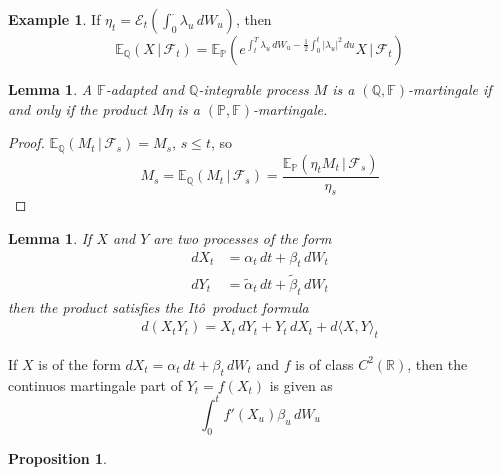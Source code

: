 \documentclass[10pt, oneside, reqno]{amsbook}
\theoremstyle{plain}%
\newtheorem{lem}[thm]{Lemma}
\newtheorem{prop}[thm]{Proposition}
\theoremstyle{definition}
\newtheorem{exmp}[thm]{Example}
\theoremstyle{rem}
\theoremstyle{definition}
\def \P {\ensuremath{\mathcal{P}}}
\newcommand{\given}{ \, | \,}
\newcommand{\sigf}{\mathcal{F}}
\newcommand{\Q}{\mathbb{Q}}
\newcommand{\R}{\mathbb{R}}
\newcommand{\E}{\mathbb{E}}
\renewcommand{\P}{\mathbb{P}}
\newcommand{\F}{\mathbb{F}}
\newcommand{\ito}{It\^o\ }
\newcommand{\doleans}[1]{\mathcal E_t \left(\int_0^\cdot #1 \right)}
\numberwithin{equation}{chapter}
\begin{document}
\begin{exmp}
    If $\eta_t = \doleans{\lambda_u \, dW_u}$, then \[
        \E_\Q(X \given \sigf_t) = \E_\P(e^{\int_t^T \lambda_u \, dW_u - \frac{1}{2} \int_0^t |\lambda_u|^2 \, du} X \given \sigf_t)
    \] 
\end{exmp}


\begin{lem}
    \label{lem:martingale_equivalence_measures}
    A $\F$-adapted and $\Q$-integrable process $M$ is a $(\Q, \F)$-martingale if and only if the product $M \eta$ is a $(\P, \F)$-martingale.
\end{lem}

\begin{proof}
    $\E_\Q(M_t \given \sigf_s) = M_s$, $s \leq t$, so \[
        M_s = \E_\Q(M_t \given \sigf_s) = \frac{\E_\P(\eta_t M_t \given \sigf_s)}{\eta_s}
    \]
\end{proof}

\begin{lem}
    If $X$ and $Y$ are two processes of the form \begin{align*}
        dX_t &= \alpha_t \, dt + \beta_t \, dW_t \\
        dY_t &= \tilde \alpha_t \, dt + \tilde \beta_t \, dW_t
    \end{align*} then the product satisfies the \ito product formula \begin{align*}
        d(X_t Y_t) = X_t \, dY_t + Y_t \, dX_t + d \langle X, Y \rangle_t
    \end{align*}    
\end{lem}

If $X$ is of the form $dX_t = \alpha_t \, dt + \beta_t \, dW_t$ and $f$ is of class $C^2(\R)$, then the continuos martingale part of $Y_t = f(X_t)$ is given as \[
    \int_0^t f'(X_u) \beta_u \, dW_u
\]

\begin{prop}
    \label{prop:proposition_1.1}
\end{prop}
\end{document}
